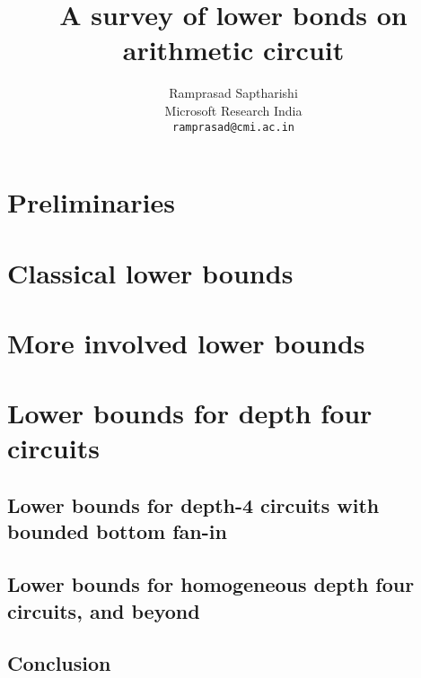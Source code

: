 \documentclass[12pt]{report}
\begin{document}
\title{A survey of lower bonds on arithmetic circuit}
\author{Ramprasad Saptharishi\\Microsoft Research India\\
{\tt ramprasad@cmi.ac.in}}
\maketitle 

\begin{abstract}
\lipsum[1-2]
\end{abstract}

\tableofcontents

\part{Preliminaries}









\part{Classical lower bounds}





\part{More involved lower bounds}





\part{Lower bounds for depth four circuits}

\chapter{Lower bounds for depth-4 circuits with bounded bottom fan-in}

\chapter{Lower bounds for homogeneous depth four circuits, and beyond}

\chapter{Conclusion}




\end{document}
